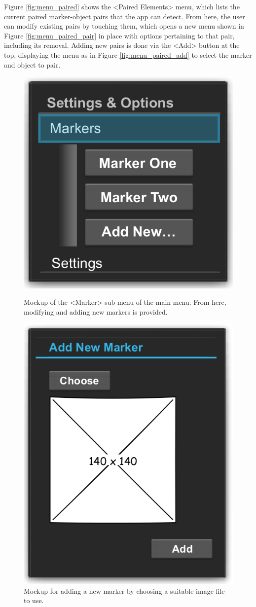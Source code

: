 Figure \ref{fig:menu_paired} shows the <Paired Elements> menu, which lists the current paired marker-object pairs that the app can detect.
From here, the user can modify existing pairs by touching them, which opens a new menu shown in Figure \ref{fig:menu_paired_pair} in place with options pertaining to that pair, including its removal.
Adding new pairs is done via the <Add> button at the top, displaying the menu as in Figure \ref{fig:menu_paired_add} to select the marker and object to pair.

\begin{figure}[H]
	\centering
		\centering
		\includegraphics[width=0.5\linewidth]{img/menu_marker.png}
		\caption[Marker Element Menu Mockup.]{Mockup of the <Marker> sub-menu of the main menu. From here, modifying and adding new markers is provided.}
		\label{fig:menu_marker}
	\endminipage\hfill
		\centering
		\includegraphics[width=0.5\linewidth]{img/menu_marker_add.png}
		\caption[Marker Add Menu Mockup.]{Mockup for adding a new marker by choosing a suitable image file to use.}
		\label{fig:menu_marker_add}
	\endminipage\hfill

\end{figure}
